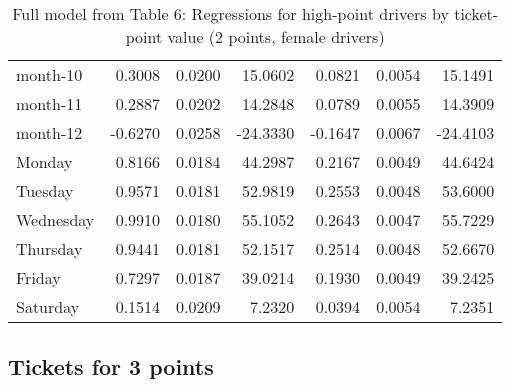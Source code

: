 \documentclass[10pt]{article}
\begin{document}
\begin{table}[ht]
\begin{tabular}{lrrrrrr}
  month-10 & 0.3008 & 0.0200 & 15.0602 & 0.0821 & 0.0054 & 15.1491 \\ 
  month-11 & 0.2887 & 0.0202 & 14.2848 & 0.0789 & 0.0055 & 14.3909 \\ 
  month-12 & -0.6270 & 0.0258 & -24.3330 & -0.1647 & 0.0067 & -24.4103 \\ 
  Monday & 0.8166 & 0.0184 & 44.2987 & 0.2167 & 0.0049 & 44.6424 \\ 
  Tuesday & 0.9571 & 0.0181 & 52.9819 & 0.2553 & 0.0048 & 53.6000 \\ 
  Wednesday & 0.9910 & 0.0180 & 55.1052 & 0.2643 & 0.0047 & 55.7229 \\ 
  Thursday & 0.9441 & 0.0181 & 52.1517 & 0.2514 & 0.0048 & 52.6670 \\ 
  Friday & 0.7297 & 0.0187 & 39.0214 & 0.1930 & 0.0049 & 39.2425 \\ 
  Saturday & 0.1514 & 0.0209 & 7.2320 & 0.0394 & 0.0054 & 7.2351 \\ 
   \hline
\end{tabular}
\caption{Full model from Table 6: Regressions for high-point drivers by ticket-point value (2 points, female drivers)} 
\label{tab_6_2_pts_no_age_F}
\end{table}


\clearpage
\pagebreak




\subsection{Tickets for 3 points}



\end{document}
